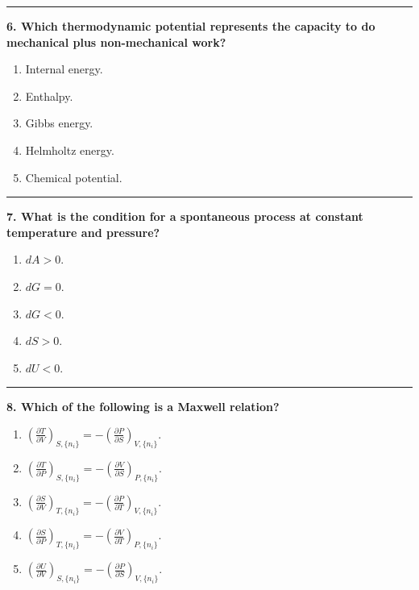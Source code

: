 \documentclass[
  9pt,
]{extbook}
\providecommand{\tightlist}{%
  \setlength{\itemsep}{0pt}\setlength{\parskip}{0pt}}
\theoremstyle{definition}
\theoremstyle{definition}
\theoremstyle{definition}
\theoremstyle{definition}
\theoremstyle{remark}
\begin{document}
\begin{center}\rule{0.5\linewidth}{0.5pt}\end{center}

\textbf{6. Which thermodynamic potential represents the capacity to do mechanical plus non-mechanical work?}

\begin{enumerate}
\def\labelenumi{\alph{enumi}.}
\tightlist
\item
  Internal energy.
\item
  Enthalpy.
\item
  Gibbs energy.
\item
  Helmholtz energy.
\item
  Chemical potential.
\end{enumerate}

\begin{center}\rule{0.5\linewidth}{0.5pt}\end{center}

\textbf{7. What is the condition for a spontaneous process at constant temperature and pressure?}

\begin{enumerate}
\def\labelenumi{\alph{enumi}.}
\tightlist
\item
  \(dA > 0\).
\item
  \(dG = 0\).
\item
  \(dG < 0\).
\item
  \(dS > 0\).
\item
  \(dU < 0\).
\end{enumerate}

\begin{center}\rule{0.5\linewidth}{0.5pt}\end{center}

\textbf{8. Which of the following is a Maxwell relation?}

\begin{enumerate}
\def\labelenumi{\alph{enumi}.}
\tightlist
\item
  \(\left(\frac{\partial T}{\partial V}\right)_{S,\{n_i\}} = -\left(\frac{\partial P}{\partial S}\right)_{V,\{n_i\}}\).
\item
  \(\left(\frac{\partial T}{\partial P}\right)_{S,\{n_i\}} = -\left(\frac{\partial V}{\partial S}\right)_{P,\{n_i\}}\).
\item
  \(\left(\frac{\partial S}{\partial V}\right)_{T,\{n_i\}} = -\left(\frac{\partial P}{\partial T}\right)_{V,\{n_i\}}\).
\item
  \(\left(\frac{\partial S}{\partial P}\right)_{T,\{n_i\}} = -\left(\frac{\partial V}{\partial T}\right)_{P,\{n_i\}}\).
\item
  \(\left(\frac{\partial U}{\partial V}\right)_{S,\{n_i\}} = -\left(\frac{\partial P}{\partial S}\right)_{V,\{n_i\}}\).
\end{enumerate}
\end{document}
